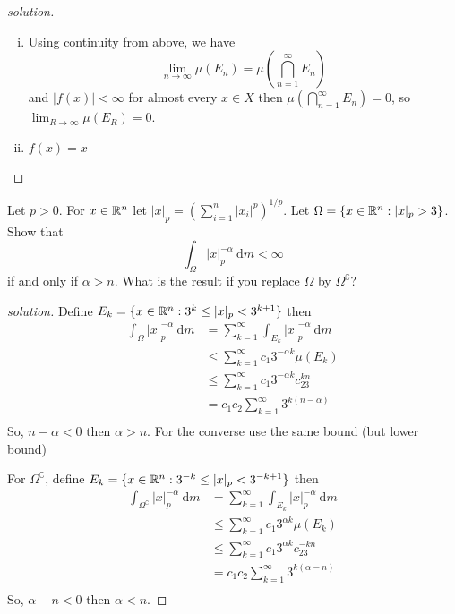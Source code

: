 \begin{proof}[solution]
  \begin{enumerate}[(i)]
    \item Using continuity from above, we have
    \[\lim_{n\to\infty} \mu(E_n) = \mu\left(\bigcap_{n=1}^\infty E_n\right)\]
    and $|f(x)| < \infty$ for almost every $x \in X$ then $\mu\left(\bigcap_{n=1}^\infty E_n\right) = 0$, so $\lim_{R\to\infty} \mu(E_R) = 0$.
    \item $f(x) = x$
  \end{enumerate}
\end{proof}

\begin{problem}
  Let $p > 0$. For $x \in \mathbb R^n$ let $|x|_p = (\sum_{i=1}^n |x_i|^p)^{1/p}$. Let $\Omega = \{x \in \mathbb R^n : |x|_p > 3\}$.
  Show that 
  \[\int_{\Omega} |x|_p^{-\alpha}\ \mathrm{d}m < \infty\]
  if and only if $\alpha > n$. What is the result if you replace $\Omega$ by $\Omega^\complement$?
\end{problem}

\begin{proof}[solution]
  Define $E_k = \{x \in \mathbb R^n : 3^k \le |x|_p < 3^{k+1}\}$ then
  \begin{align*}
    \int_{\Omega} |x|_p^{-\alpha}\ \mathrm{d}m &= \sum_{k=1}^\infty \int_{E_k} |x|_p^{-\alpha}\ \mathrm{d}m\\
    &\le \sum_{k=1}^\infty c_1 3^{-\alpha k}\mu(E_k)\\
    &\le \sum_{k=1}^\infty c_1 3^{-\alpha k}c_23^{kn}\\
    &= c_1c_2\sum_{k=1}^\infty 3^{k(n - \alpha)}\\
  \end{align*}
  So, $n - \alpha < 0$ then $\alpha > n$. For the converse use the same bound (but lower bound)
  
  For $\Omega^\complement$, define $E_k = \{x \in \mathbb R^n : 3^{-k} \le |x|_p < 3^{-k+1}\}$ then
  \begin{align*}
    \int_{\Omega^\complement} |x|_p^{-\alpha}\ \mathrm{d}m &= \sum_{k=1}^\infty \int_{E_k} |x|_p^{-\alpha}\ \mathrm{d}m\\
    &\le \sum_{k=1}^\infty c_1 3^{\alpha k}\mu(E_k)\\
    &\le \sum_{k=1}^\infty c_1 3^{\alpha k}c_23^{-kn}\\
    &= c_1c_2\sum_{k=1}^\infty 3^{k(\alpha - n)}\\
  \end{align*}
  So, $\alpha - n < 0$ then $\alpha < n$.
\end{proof}

